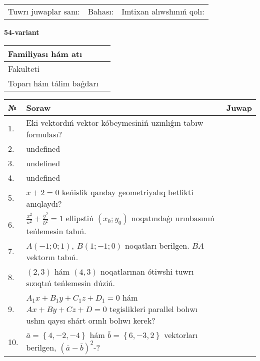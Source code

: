 \documentclass{article}
\begin{document}
\vspace{0.7cm}

\begin{tabular}{lll}
Tuwrı juwaplar sanı: \underline{\hspace{1cm}} & 
Bahası: \underline{\hspace{1cm}} & 
Imtixan alıwshınıń qolı: \underline{\hspace{2cm}} \\
\end{tabular}

\egroup

\newpage


\textbf{54-variant}\\

\bgroup
\def\arraystretch{1.6} %

\begin{tabular}{|m{5.7cm}|m{9.5cm}|}
\hline
Familiyası hám atı & \\
\hline
Fakulteti  & \\
\hline
Toparı hám tálim baǵdarı  & \\
\hline
\end{tabular}

\vspace{0.7cm}

\begin{tabular}{|m{0.7cm}|m{10cm}|m{4cm}|}
\hline
№ & Soraw & Juwap \\
\hline
1. & Eki vektordıń vektor kóbeymesiniń uzınlıǵın tabıw formulası? &  \\
\hline
2. & undefined &  \\
\hline
3. & undefined &  \\
\hline
4. & undefined &  \\
\hline
5. & \(x + 2 = 0\) keńislik qanday geometriyalıq betlikti anıqlaydı? &  \\
\hline
6. & \(\frac{x^{2}}{a^{2}} + \frac{y^{2}}{b^{2}} = 1\) ellipstiń \((x_{0};y_{0})\) noqatındaǵı urınbasınıń teńlemesin tabıń. &  \\
\hline
7. & \(A (- 1;0;1),\ B (1; - 1;0)\) noqatları berilgen. \(\bar{BA}\) vektorın tabıń. &  \\
\hline
8. & $(2, 3)$ hám $(4, 3)$ noqatlarınan ótiwshi tuwrı sızıqtıń teńlemesin dúziń. &  \\
\hline
9. & \(A_{1}x + B_{1}y + C_{1}z + D_{1} = 0\) hám \(Ax + By + Cz + D = 0\) tegislikleri parallel bolıwı ushın qaysı shárt orınlı bolıwı kerek? &  \\
\hline
10. & \(\bar{a} = \left\{ 4,- 2,- 4 \right\}\) hám \(\bar{b} = \left\{ 6,- 3, 2 \right\}\) vektorları berilgen, \((\bar{a} - \bar{b}) ^{2}\)-? & \\
\hline
\end{tabular}
\end{document}
